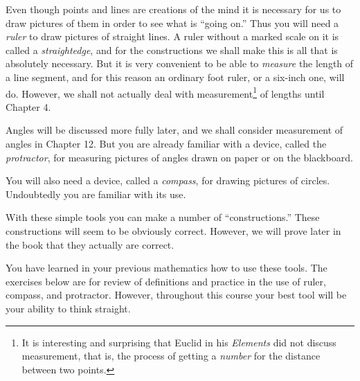 \documentclass[11pt]{book}
\theoremstyle{bkplain}
\theoremstyle{XIplainnote}
\theoremstyle{bkplain}
\theoremstyle{bkplain}
\begin{document}
\setcounter{footnote}{0}
Even though points and lines are creations of the mind it is necessary for us to
draw pictures of them in order to see what is ``going on.'' Thus you will need a
\emph{ruler} to draw pictures of straight lines. A ruler without a marked scale
on it is called a \emph{straightedge}, and for the constructions we shall make
this is all that is absolutely necessary. But it is very convenient to be able to
\emph{measure} the length of a line segment, and for this reason an ordinary foot
ruler, or a six-inch one, will do. However, we shall not actually deal with
measurement\footnote{It is interesting and surprising that Euclid in his
\emph{Elements} did not discuss measurement, that is, the process of getting a
\emph{number} for the distance between two points.}
of lengths until Chapter 4.

Angles will be discussed more fully later, and we shall consider measurement of
angles in Chapter 12. But you are already familiar with a device, called the
\emph{protractor}, for measuring pictures of angles drawn on paper or on the
blackboard.

You will also need a device, called a \emph{compass}, for drawing pictures of
circles. Undoubtedly you are familiar with its use.

With these simple tools you can make a number of ``constructions.'' These
constructions will seem to be obviously correct. However, we will prove later in
the book that they actually are correct.

You have learned in your previous mathematics how to use these tools. The
exercises below are for review of definitions and practice in the use of ruler,
compass, and protractor. However, throughout this course your best tool will be
your ability to think straight.
\end{document}
